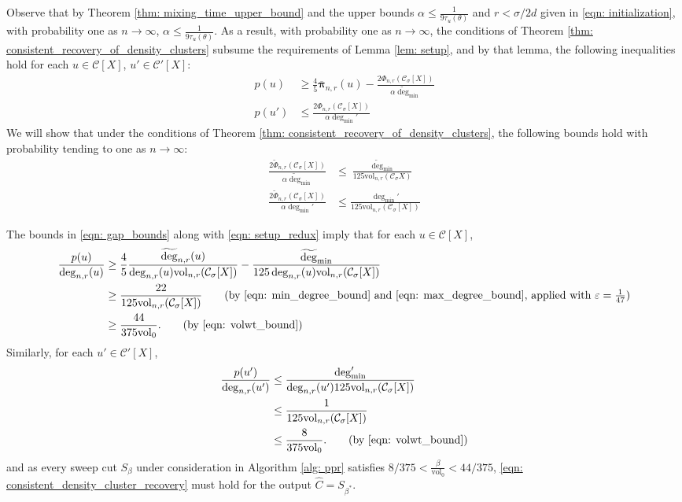 \documentclass[11pt,twoside]{article}
\newcommand{\vol}{\mathrm{vol}}
\newcommand{\1}{\mathbf{1}}
\newcommand{\pbf}{p}        %
\newcommand{\pibf}{\bm{\pi}}
\newcommand{\Xbf}{X}             %
\newcommand{\Cset}{\mathcal{C}}
\newcommand{\Csig}{\Cset_{\sigma}}
\newcommand{\degminpr}{\deg_{\min}'}
\newcommand{\degminwt}{\widetilde{\deg}_{\min}}
\begin{document}
Observe that by Theorem \ref{thm: mixing_time_upper_bound} and the upper bounds $\alpha \leq \frac{1}{9 \tau_{u}(\theta)}$ and $r < \sigma/2d$ given in \eqref{eqn: initialization}, with probability one as $n \to \infty$, $\alpha \leq \frac{1}{9 \tau_{u}(\theta)}$. As a result, with probability one as $n \to \infty$, the conditions of Theorem \ref{thm: consistent_recovery_of_density_clusters} subsume the requirements of Lemma \ref{lem: setup}, and by that lemma, the following inequalities hold for each $u \in \Cset[\Xbf]$, $u' \in \Cset'[\Xbf]$:
\begin{align}
\pbf(u) & \geq \frac{4}{5} \overline{\pibf}_{n,r}(u) - \frac{2 \Phi_{n,r}(\Csig[\Xbf])}{\alpha \degminwt} \nonumber \\
\pbf(u') & \leq \frac{2 \Phi_{n,r}(\Csig[\Xbf])}{\alpha \degminpr} \label{eqn: setup_redux}
\end{align}
We will show that under the conditions of Theorem \ref{thm: consistent_recovery_of_density_clusters}, the following bounds hold with probability tending to one as $n \to \infty$:
\begin{align}
\frac{2\widetilde{\Phi}_{n,r}(\Csig[\Xbf])}{\alpha \degminwt} & \leq \frac{\degminwt}{125 \vol_{n,r}(\Csig{\Xbf})} \nonumber \\
\frac{2\widetilde{\Phi}_{n,r}(\Csig[\Xbf])}{\alpha \degminpr} & \leq \frac{\degminpr}{125 \vol_{n,r}(\Csig[\Xbf])} \label{eqn: gap_bounds}
\end{align}

The bounds in \eqref{eqn: gap_bounds} along with \eqref{eqn: setup_redux} imply that for each $u \in \Cset[\Xbf]$,
\begin{align*}
\frac{\pbf(u)}{\deg_{n,r}(u)} & \geq \frac{4}{5} \frac{\widetilde{\deg}_{n,r}(u)}{\deg_{n,r}(u) \vol_{n,r}(\Csig[\Xbf])} - \frac{\degminwt}{125 \deg_{n,r}(u) \vol_{n,r}(\Csig[\Xbf])} \\
& \geq \frac{22}{125 \vol_{n,r}(\Csig[\Xbf])} \tag{by \eqref{eqn: min_degree_bound} and \eqref{eqn: max_degree_bound}, applied with $\varepsilon = \frac{1}{47}$} \\
& \geq \frac{44}{375 \vol_0}. \tag{by \eqref{eqn: volwt_bound}}
\end{align*}
Similarly, for each $u' \in \Cset'[\Xbf]$,
\begin{align*}
\frac{\pbf(u')}{\deg_{n,r}(u')} & \leq \frac{\degminpr}{\deg_{n,r}(u') 125 \vol_{n,r}(\Csig[\Xbf])}  \\
& \leq \frac{1}{125 \vol_{n,r}(\Csig[\Xbf])} \\
& \leq \frac{8}{375 \vol_0}. \tag{by \eqref{eqn: volwt_bound}}
\end{align*}
and as every sweep cut $S_\beta$ under consideration in Algorithm \ref{alg: ppr} satisfies $8/375 < \frac{\beta}{\vol_0} < 44/375$, \eqref{eqn: consistent_density_cluster_recovery} must hold for the output $\widehat{C} = S_{\beta^*}$.
\end{document}
